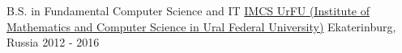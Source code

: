 


\begin{cventries}


\cventry
{B.S. in Fundamental Computer Science and IT}
{\href{https://insma.urfu.ru/en/}{IMCS UrFU \newline (Institute of Mathematics and Computer Science in Ural Federal University)}}
{Ekaterinburg, Russia}
{2012 - 2016}
{ %
}


\end{cventries}